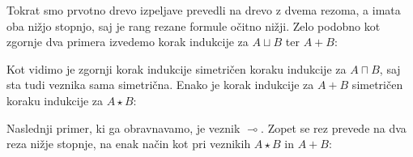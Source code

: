Tokrat smo prvotno drevo izpeljave prevedli na drevo z dvema rezoma, a imata oba nižjo stopnjo, saj je rang rezane formule očitno nižji. Zelo podobno kot zgornje dva primera izvedemo korak indukcije za $A \sqcup B$ ter $A+B$:
\begin{prooftree}


\end{prooftree}
\dol
\begin{prooftree}
\end{prooftree}
Kot vidimo je zgornji korak indukcije simetričen koraku indukcije za $A \sqcap B$, saj sta tudi veznika sama simetrična. Enako je korak indukcije za $A+B$ simetričen koraku indukcije za $A \star B$:
\begin{prooftree}


\end{prooftree}
\dol
\begin{prooftree}

\end{prooftree}
Naslednji primer, ki ga obravnavamo, je veznik $\multimap$. Zopet se rez prevede na dva reza nižje stopnje, na enak način kot pri veznikih $A\star B$ in $A+B$:
\begin{prooftree}


\end{prooftree}

